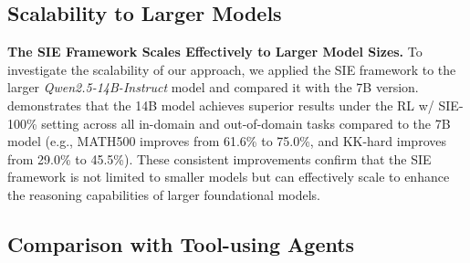 \documentclass{article} %
\begin{document}
\subsection{Scalability to Larger Models}
\label{app:scalability}


\textbf{The SIE Framework Scales Effectively to Larger Model Sizes.}
To investigate the scalability of our approach, we applied the SIE framework to the larger \textit{Qwen2.5-14B-Instruct} model and compared it with the 7B version.
 demonstrates that the 14B model achieves superior results under the RL w/ SIE-100\% setting across all in-domain and out-of-domain tasks compared to the 7B model (e.g., MATH500 improves from 61.6\% to 75.0\%, and KK-hard improves from 29.0\% to 45.5\%).
These consistent improvements confirm that the SIE framework is not limited to smaller models but can effectively scale to enhance the reasoning capabilities of larger foundational models.


\begin{table}[!t]
\centering
\caption{Comparison of performance between Qwen2.5-7B-Instruct and Qwen2.5-14B-Instruct. The 14B model achieves consistent gains, demonstrating the scalability of the SIE framework.}
\vspace{5pt}
\label{tab:scale_comparison}
\end{table}

\subsection{Comparison with Tool-using Agents}
\label{app:tog_comparison}
\end{document}
